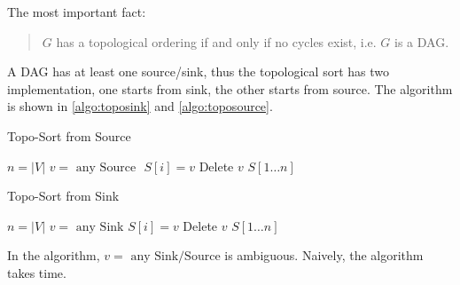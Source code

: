 \observation

The most important fact:
\begin{quote}
$G$ has a topological ordering if and only if no cycles exist,
i.e. $G$ is a DAG.
\end{quote}

A DAG has at least one source/sink, thus the topological sort has
two implementation, one starts from sink, the other starts from source.
The algorithm is shown in \cref{algo:toposink} and \cref{algo:toposource}.

\begin{minipage}[t]{0.48\linewidth}
\vspace{0pt}
\begin{algorithm}[H]
    \caption{Topo-Sort from Source}\label{algo:toposource}
    \begin{algorithmic}[1]
            \State $n = |V|$
                \State $v = \text{ any Source }$
                \State $S[i] = v$
                \State Delete $v$
            \EndFor
            \Return $S[1 \ldots n]$
        \EndProcedure
    \end{algorithmic}
\end{algorithm}
\vspace{2pt}
\end{minipage}\hfill
\begin{minipage}[t]{0.48\linewidth}
\vspace{0pt}
\begin{algorithm}[H]
    \caption{Topo-Sort from Sink}\label{algo:toposink}
    \begin{algorithmic}[1]
            \State $n = |V|$
                \State $v = \text{ any Sink}$
                \State $S[i] = v$
                \State Delete $v$
            \EndFor
            \Return $S[1 \ldots n]$
        \EndProcedure
    \end{algorithmic}
\end{algorithm}
\vspace{2pt}
\end{minipage}

In the algorithm, $v = \text{ any Sink/Source}$ is ambiguous.
Naively, the algorithm takes  time.

